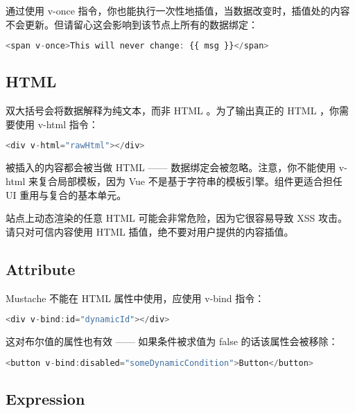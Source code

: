 通过使用 v-once 指令，你也能执行一次性地插值，当数据改变时，插值处的内容不会更新。但请留心这会影响到该节点上所有的数据绑定：

\begin{lstlisting}[language=JavaScript]
<span v-once>This will never change: {{ msg }}</span>
\end{lstlisting}




\subsection{HTML}

双大括号会将数据解释为纯文本，而非 HTML 。为了输出真正的 HTML ，你需要使用 v-html 指令：

\begin{lstlisting}[language=JavaScript]
<div v-html="rawHtml"></div>
\end{lstlisting}

被插入的内容都会被当做 HTML —— 数据绑定会被忽略。注意，你不能使用 v-html 来复合局部模板，因为 Vue 不是基于字符串的模板引擎。组件更适合担任 UI 重用与复合的基本单元。

站点上动态渲染的任意 HTML 可能会非常危险，因为它很容易导致 XSS 攻击。请只对可信内容使用 HTML 插值，绝不要对用户提供的内容插值。




\subsection{Attribute}

Mustache 不能在 HTML 属性中使用，应使用 v-bind 指令：

\begin{lstlisting}[language=JavaScript]
<div v-bind:id="dynamicId"></div>
\end{lstlisting}

这对布尔值的属性也有效 —— 如果条件被求值为 false 的话该属性会被移除：

\begin{lstlisting}[language=JavaScript]
<button v-bind:disabled="someDynamicCondition">Button</button>
\end{lstlisting}





\subsection{Expression}

